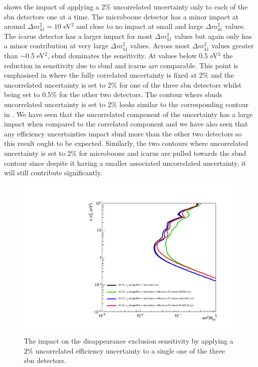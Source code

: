  shows the impact of applying a 2\% uncorrelated uncertainty only to each of the \gls{sbn} detectors one at a time. The \gls{microboone} detector has a minor impact at around $\Delta m ^2_{41} = 10$ eV$^2$ and close to no impact at small and large $\Delta m ^2_{41}$ values. The \gls{icarus} detector has a larger impact for most $\Delta m ^2_{41}$ values but again only has a minor contribution at very large $\Delta m ^2_{41}$ values. Across most $\Delta m ^2_{41}$ values greater than $\sim$0.5 eV$^2$, \gls{sbnd} dominates the sensitivity. At values below 0.5 eV$^2$ the reduction in sensitivity due to \gls{sbnd} and \gls{icarus} are comparable. This point is emphasised in  where the fully correlated uncertainty is fixed at 2\% and the uncorrelated uncertainty is set to 2\% for one of the three \gls{sbn} detectors whilst being set to 0.5\% for the other two detectors. The contour where \glspl{sbnd} uncorrelated uncertainty is set to 2\% looks similar to the corresponding contour in . We have seen that the uncorrelated component of the uncertainty has a large impact when compared to the correlated component and we have also seen that any efficiency uncertainties impact \gls{sbnd} more than the other two detectors so this result ought to be expected. Similarly, the two contours where uncorrelated uncertainty is set to 2\% for \gls{microboone} and \gls{icarus} are pulled towards the \gls{sbnd} contour since despite it having a smaller associated uncorrelated uncertainty, it will still contribute significantly. 

\begin{figure}[!h]
    \centering
    \includegraphics[width = \largefigwidth]{figures-chap6/exclusion_contours/efficiency_systematics/numu_disapp_2pct_uncor_per_detector.pdf}
    \caption[Impact of a 2\% uncorrelated efficiency systematic on the \numu disappearance channel for each individual detector.]{The impact on the \numu disappearance exclusion sensitivity by applying a 2\% uncorrelated efficiency uncertainty to a single one of the three \gls{sbn} detectors.}
    \label{fig:numu_uncorr_det}
\end{figure}

